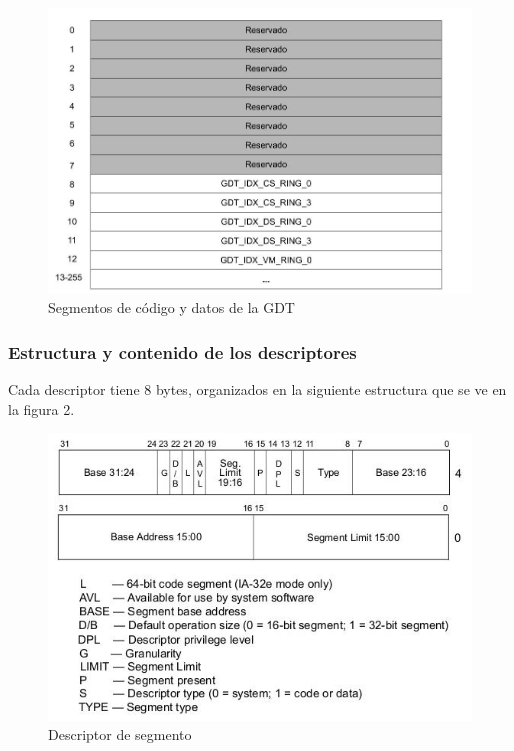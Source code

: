 \documentclass[a4paper]{article}
\begin{document}
\begin{figure}[!htb]
  \begin{center}
	\includegraphics[scale=0.3]{img/GDT1.jpg}
	\caption{Segmentos de código y datos de la GDT}
  \end{center}
\end{figure}

\subsubsection{Estructura y contenido de los descriptores}
Cada descriptor tiene 8 bytes, organizados en la siguiente estructura que se ve en la figura 2.

\begin{figure}[!htb]
  \begin{center}
	\includegraphics[scale=0.6]{img/gdtDescriptorSegmento.jpg}
	\caption{Descriptor de segmento}
  \end{center}
\end{figure}
\end{document}
